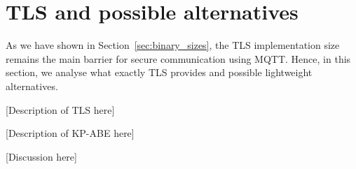\chapter{TLS and possible alternatives}\label{chap:TLS}

As we have shown in Section~\ref{sec:binary_sizes}, the TLS implementation size remains the main barrier for secure communication using MQTT.
Hence, in this section, we analyse what exactly TLS provides and possible lightweight alternatives.

[Description of TLS here]

[Description of KP-ABE here]

[Discussion here]